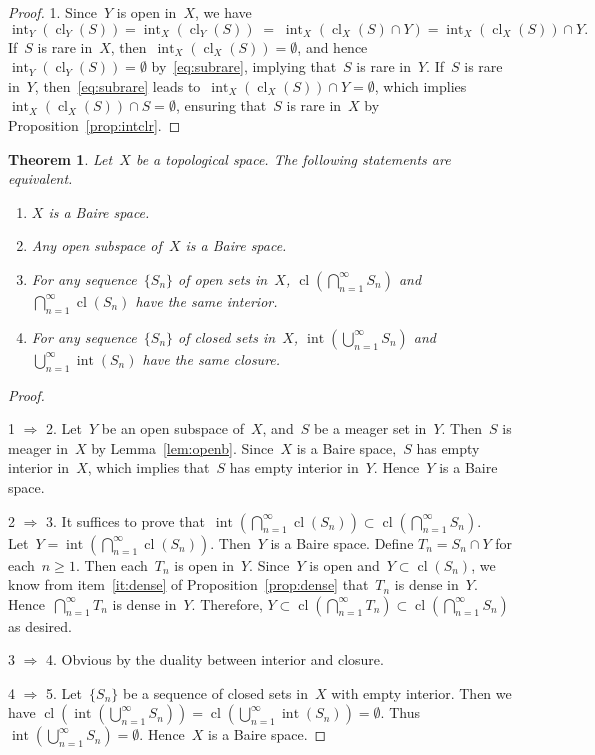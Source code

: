 \documentclass[11pt,a4paper]{article}
\newtheorem{theorem}{Theorem}[section]
\theoremstyle{definition}
\DeclareMathOperator{\inter}{int}
\DeclareMathOperator{\cl}{cl}
\numberwithin{equation}{section}
\begin{document}
\begin{proof} 
  1. Since~$Y$ is open in~$X$, we have
 \begin{equation}
   \label{eq:subrare}
     \inter_Y(\cl_Y(S)) = \inter_X(\cl_Y(S)) \;=\; \inter_X(\cl_X(S)\cap Y) = \inter_X(\cl_X(S))\cap Y.
 \end{equation}
   If~$S$ is rare in~$X$, then~$\inter_X(\cl_X(S))=\emptyset$, and hence~$\inter_Y(\cl_Y(S))
   = \emptyset$ by~\eqref{eq:subrare}, 
   implying that~$S$ is rare in~$Y$. 
   If~$S$ is rare in~$Y$, then~\eqref{eq:subrare} leads
   to~$\inter_{X}(\cl_X(S))\cap Y = \emptyset$, which implies~$\inter_X(\cl_X(S))\cap
   S = \emptyset$,  ensuring that~$S$ is rare in~$X$ by Proposition~\ref{prop:intclr}.
\end{proof}


\begin{theorem}
  \label{th:intcl}
   Let~$X$ be a topological space. The following statements are equivalent.  
   \begin{enumerate}
     \item $X$ is a Baire space.
     \item Any open subspace of~$X$ is a Baire space. 
     \item For any sequence~$\{S_n\}$ of open sets in~$X$, $\cl(\bigcap_{n=1}^\infty S_n)$ and
       $\bigcap_{n=1}^\infty \cl(S_n)$ have the same interior. 
     \item For any sequence~$\{S_n\}$ of closed sets in~$X$, $\inter(\bigcup_{n=1}^\infty S_n)$ and
       $\bigcup_{n=1}^\infty \inter(S_n)$ have the same closure. 
   \end{enumerate}
\end{theorem}

\begin{proof}~

  1 $\Rightarrow$ 2. Let~$Y$ be an open subspace of~$X$, and~$S$ be a meager set in~$Y$.
  Then~$S$ is meager in~$X$ by Lemma~\ref{lem:openb}. Since~$X$ is a Baire space,~$S$ has empty interior in~$X$, which
  implies that~$S$ has empty interior in~$Y$. Hence~$Y$ is a Baire space. 

  2 $\Rightarrow$ 3. It suffices to prove that~$\inter(\bigcap_{n=1}^\infty \cl(S_n))\subset\cl(\bigcap_{n=1}^\infty S_n)$. 
  Let~$Y=\inter(\bigcap_{n=1}^\infty \cl(S_n))$. Then~$Y$ is a Baire space. 
  Define $T_n = S_n\cap Y$ for each~$n\ge 1$. Then each~$T_n$ is open in~$Y$. Since~$Y$ is open
  and~$Y\subset \cl(S_n)$, we know from item~\ref{it:dense} of Proposition~\ref{prop:dense}
  that~$T_n$ is dense in~$Y$. Hence~$\bigcap_{n=1}^\infty T_n$
  is dense in~$Y$. Therefore, $Y \subset \cl(\bigcap_{n=1}^\infty T_n) \subset
  \cl(\bigcap_{n=1}^\infty S_n)$ as desired. 

  3 $\Rightarrow$ 4. Obvious by the duality between interior and closure. 

  4 $\Rightarrow$ 5. Let~$\{S_n\}$ be a sequence of closed sets in~$X$ with empty interior. Then we
    have
  $\cl(\inter(\bigcup_{n=1}^\infty S_n)) = \cl(\bigcup_{n=1}^\infty \inter(S_n)) = \emptyset$.
  Thus~$\inter(\bigcup_{n=1}^\infty S_n) = \emptyset$. Hence~$X$ is a Baire space. 
\end{proof}
\end{document}
